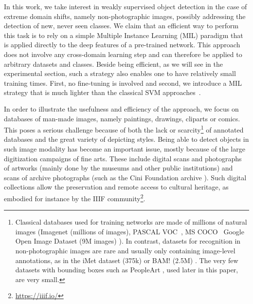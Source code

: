 \documentclass[preprint]{elsarticle}
\begin{document}
In this work, we take interest in weakly supervised object detection in the case of extreme domain shifts, namely non-photographic images, possibly addressing the detection of new, never seen classes.  We claim that an efficient way to perform this task is to rely on a simple Multiple Instance Learning (MIL) paradigm that is applied directly to the deep features of a pre-trained network. This approach does not involve any cross-domain learning step and can therefore be applied to arbitrary datasets and classes. Beside being efficient, as we will see in the experimental section, such a strategy also enables one to have relatively small training times. First, no fine-tuning is involved and second, we introduce a MIL strategy  that is much lighter than the classical SVM approaches~\cite{andrews_support_2003}. 

In order to illustrate the usefulness and efficiency of the approach, we focus on databases of man-made images, namely paintings, drawings, cliparts or comics. This poses a serious challenge because of both the lack or scarcity\footnote{Classical databases used for training networks are made of millions of natural images (Imagenet \cite{russakovsky_imagenet_2014}(millions of images), PASCAL VOC~\cite{everingham_pascal_2007}, MS COCO~\cite{lin_microsoft_2014} Google Open Image Dataset (9M images) \cite{kuznetsova_open_2020}). In contrast, datasets for recognition in non-photographic images are rare and usually only containing image-level annotations, as in the iMet dataset (375k) \cite{zhang_imet_2019} or BAM! (2.5M) \cite{wilber_bam_2017}. The very few datasets with bounding boxes such as PeopleArt \cite{westlake_detecting_2016}, used later in this paper, are very small.}
 of annotated databases and the great variety of depicting styles. Being able to detect objects in such image modality has become an important issue, mostly because of the large digitization campaigns of fine arts. These include digital scans and photographs of artworks (mainly done by the museums and other public institutions) and scans of archive photographs (such as the Cini Foundation archive \cite{seguin_new_2018}).
Such digital collections allow the preservation and remote access to cultural heritage, as embodied for instance by the IIIF community\footnote{\url{https://iiif.io/}}.   
\end{document}
